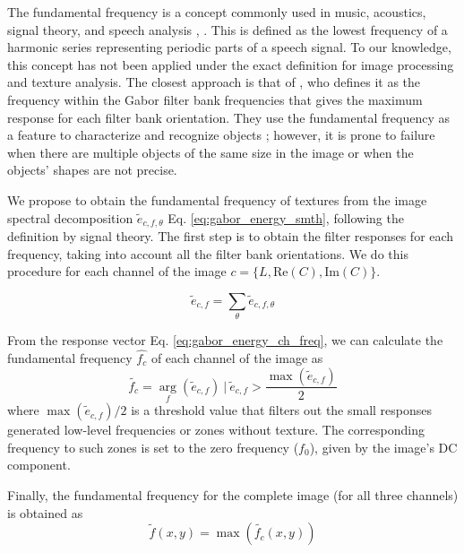 \documentclass[journal]{IEEEtran}
\newcommand{\RE}{\mathrm{Re}}
\newcommand{\IM}{\mathrm{Im}}
\begin{document}
The fundamental frequency is a concept commonly used in music, acoustics, signal theory, and speech analysis \cite{Benward:BOOK:2014}, \cite{Sigmund:ITC:2013}. This is defined as the lowest frequency of a harmonic series representing periodic parts of a speech signal. To our knowledge, this concept has not been applied under the exact definition for image processing and texture analysis. The closest approach is that of \cite{Kamarainen.Kyrki.ea:ICPR:2002}, who defines it as the frequency within the Gabor filter bank frequencies that gives the maximum response for each filter bank orientation. They use the fundamental frequency as a feature to characterize and recognize objects \cite{Kamarainen.Kyrki.ea:DSP:2002}; however, it is prone to failure when there are multiple objects of the same size in the image or when the objects' shapes are not precise.

We propose to obtain the fundamental frequency of textures from the image spectral decomposition $\widetilde{e}_{c, f, \theta}$ Eq. \eqref{eq:gabor_energy_smth}, following the definition by signal theory. The first step is to obtain the filter responses for each frequency, taking into account all the filter bank orientations. We do this procedure for each channel of the image $c=\{L, \RE(C), \IM(C)\}$.

\begin{equation}
	\widetilde{e}_{c, f} =  \underset{\theta }{\sum} \widetilde{e}_{c, f, \theta}  \label{eq:gabor_energy_ch_freq}
\end{equation}

From the response vector Eq. \eqref{eq:gabor_energy_ch_freq}, we can calculate the fundamental frequency $\widehat{f_c}$ of each channel of the image as
\begin{equation}
	\widetilde{f_c} =  \underset{f}{\arg} (\widetilde{e}_{c, f}) ~|~ \widetilde{e}_{c, f} > \frac{\max(\widetilde{e}_{c, f})}{2} \label{eq:fundamental_frequencygabor_ch}
\end{equation}
where $\max(\widetilde{e}_{c, f})/2$ is a threshold value that filters out the small responses generated low-level frequencies or zones without texture. The corresponding frequency to such zones is set to the zero frequency ($f_0$), given by the image's DC component.

Finally, the fundamental frequency for the complete image (for all three channels) is obtained as
\begin{equation}
	\widetilde{f}(x,y) =  \max(\widetilde{f_c}(x,y))  \label{eq:fundamental_freq}
\end{equation}
\end{document}
